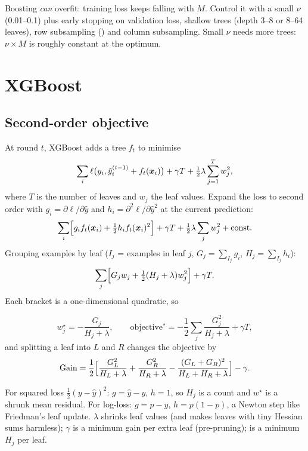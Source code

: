 \begin{remark}
	Boosting \emph{can} overfit: training loss keeps falling with $M$. Control it with a small $\nu$
	(0.01--0.1) plus early stopping on validation loss, shallow trees (depth 3--8 or 8--64 leaves),
	row subsampling () and column subsampling. Small $\nu$ needs
	more trees: $\nu\times M$ is roughly constant at the optimum.
\end{remark}

\section{XGBoost}

\subsection{Second-order objective}
At round $t$, XGBoost adds a tree $f_t$ to minimise
\[ \sum_i\ell\bigl(y_i,\hat y_i^{(t-1)}+f_t({\bm{x}}_i)\bigr)+\gamma T+\tfrac12\lambda\sum_{j=1}^Tw_j^2, \]
where $T$ is the number of leaves and $w_j$ the leaf values. Expand the loss to second order with
$g_i=\partial\ell/\partial\hat y$ and $h_i=\partial^2\ell/\partial\hat y^2$ at the current prediction:
\[ \sum_i\Bigl[g_if_t({\bm{x}}_i)+\tfrac12h_if_t({\bm{x}}_i)^2\Bigr]+\gamma T+\tfrac12\lambda\sum_jw_j^2+\text{const}. \]
Grouping examples by leaf ($I_j$ = examples in leaf $j$, $G_j=\sum_{I_j}g_i$, $H_j=\sum_{I_j}h_i$):
\[ \sum_j\Bigl[G_jw_j+\tfrac12(H_j+\lambda)w_j^2\Bigr]+\gamma T. \]
Each bracket is a one-dimensional quadratic, so
\begin{theorem}
	\[ w_j^\star=-\frac{G_j}{H_j+\lambda},\qquad
		\text{objective}^\star=-\frac12\sum_j\frac{G_j^2}{H_j+\lambda}+\gamma T, \]
	and splitting a leaf into $L$ and $R$ changes the objective by
	\[ \text{Gain}=\frac12\Bigl[\frac{G_L^2}{H_L+\lambda}+\frac{G_R^2}{H_R+\lambda}
		-\frac{(G_L+G_R)^2}{H_L+H_R+\lambda}\Bigr]-\gamma. \]
\end{theorem}
For squared loss $\frac12(y-\hat y)^2$: $g=\hat y-y$, $h=1$, so $H_j$ is a count and $w^\star$ is a
shrunk mean residual. For log-loss: $g=p-y$, $h=p(1-p)$, a Newton step like Friedman's leaf update.
$\lambda$ shrinks leaf values (and makes leaves with tiny Hessian sums harmless); $\gamma$ is a minimum
gain per extra leaf (pre-pruning);  is a minimum $H_j$ per leaf.

